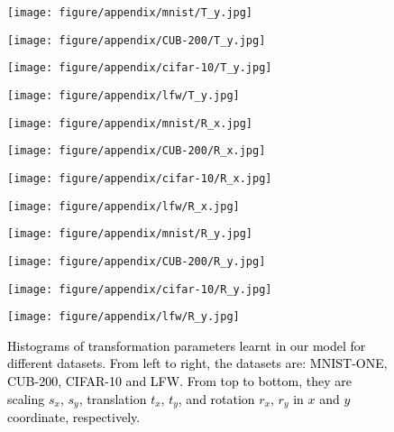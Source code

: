 \documentclass{article} \usepackage{iclr2017_conference,times}
\begin{document}
\begin{figure}[!ht]
\begin{minipage}{0.246\linewidth}
\center
\texttt{[image: figure/appendix/mnist/T\_y.jpg]}
\end{minipage}
\begin{minipage}{0.246\linewidth}
\center
\texttt{[image: figure/appendix/CUB-200/T\_y.jpg]}
\end{minipage}
\begin{minipage}{0.246\linewidth}
\center
\texttt{[image: figure/appendix/cifar-10/T\_y.jpg]}
\end{minipage}
\begin{minipage}{0.246\linewidth}
\center
\texttt{[image: figure/appendix/lfw/T\_y.jpg]}
\end{minipage}

\begin{minipage}{0.246\linewidth}
\center
\texttt{[image: figure/appendix/mnist/R\_x.jpg]}
\end{minipage}
\begin{minipage}{0.246\linewidth}
\center
\texttt{[image: figure/appendix/CUB-200/R\_x.jpg]}
\end{minipage}
\begin{minipage}{0.246\linewidth}
\center
\texttt{[image: figure/appendix/cifar-10/R\_x.jpg]}
\end{minipage}
\begin{minipage}{0.246\linewidth}
\center
\texttt{[image: figure/appendix/lfw/R\_x.jpg]}
\end{minipage}

\begin{minipage}{0.246\linewidth}
\center
\texttt{[image: figure/appendix/mnist/R\_y.jpg]}
\end{minipage}
\begin{minipage}{0.246\linewidth}
\center
\texttt{[image: figure/appendix/CUB-200/R\_y.jpg]}
\end{minipage}
\begin{minipage}{0.246\linewidth}
\center
\texttt{[image: figure/appendix/cifar-10/R\_y.jpg]}
\end{minipage}
\begin{minipage}{0.246\linewidth}
\center
\texttt{[image: figure/appendix/lfw/R\_y.jpg]}
\end{minipage}
\caption{\textcolor{black}{Histograms of transformation parameters learnt in our model for different datasets. From left to right, the datasets are: MNIST-ONE, CUB-200, CIFAR-10 and LFW. From top to bottom, they are scaling $s_x$, $s_y$, translation $t_x$, $t_y$, and rotation $r_x$, $r_y$ in $x$ and $y$ coordinate, respectively.}}
\label{Fig_Histograms}
\end{figure} 
\end{document}
